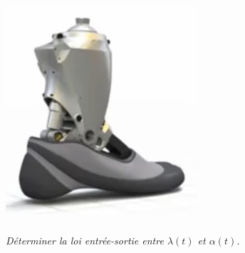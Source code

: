 \documentclass[10pt,fleqn]{article} %
\begin{document}
\ifprof
\begin{corrige}
\begin{center}
\includegraphics[width=.8\textwidth]{images/prot_01}
\end{center}
\end{corrige}
\else
\fi


\subparagraph{}
\textit{Déterminer la loi entrée-sortie entre $\lambda(t)$ et $\alpha(t)$.} 
\end{document}

